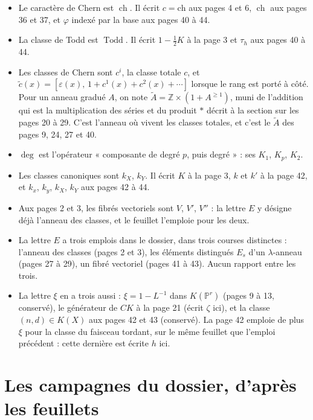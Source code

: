 \documentclass[11pt,a4paper]{article}
\begin{document}
\begin{itemize}
  \item Le caractère de Chern est $\operatorname{ch}$. Il écrit $c = \mathrm{ch}$
  aux pages 4 et 6, $\operatorname{ch}$ aux pages 36 et 37, et $\varphi$
  indexé par la base aux pages 40 à 44.
  \item La classe de Todd est $\operatorname{Todd}$. Il écrit $1 - \tfrac12 K$
  à la page 3 et $\tau_{h}$ aux pages 40 à 44.
  \item Les classes de Chern sont $c^{i}$, la classe totale $c$, et
  $\widetilde{c}(x) = [\varepsilon(x),\, 1 + c^{1}(x) + c^{2}(x) + \cdots]$
  lorsque le rang est porté à côté. Pour un anneau gradué $A$, on note
  $\widetilde{A} = \mathbb{Z} \times (1 + A^{\geqslant 1})$, muni de l'addition
  qui est la multiplication des séries et du produit $\ast$ décrit à la
  section sur les pages 20 à 29. C'est l'anneau où vivent les classes totales,
  et c'est le $\widetilde{A}$ des pages 9, 24, 27 et 40.
  \item $\deg$ est l'opérateur « composante de degré $p$, puis degré » :
  ses $K_{1}$, $K_{p}$, $K_{2}$.
  \item Les classes canoniques sont $k_{X}$, $k_{Y}$. Il écrit $K$ à la page 3,
  $k$ et $k'$ à la page 42, et $k_{x}$, $k_{y}$, $k_{X}$, $k_{Y}$ aux pages 42
  à 44.
  \item Aux pages 2 et 3, les fibrés vectoriels sont $V$, $V'$, $V''$ : la
  lettre $E$ y désigne déjà l'anneau des classes, et le feuillet l'emploie pour
  les deux.
  \item La lettre $E$ a trois emplois dans le dossier, dans trois courses
  distinctes : l'anneau des classes (pages 2 et 3), les éléments distingués
  $E_{s}$ d'un $\lambda$-anneau (pages 27 à 29), un fibré vectoriel (pages 41
  à 43). Aucun rapport entre les trois.
  \item La lettre $\xi$ en a trois aussi : $\xi = 1 - L^{-1}$ dans
  $K(\mathbb{P}^{r})$ (pages 9 à 13, conservé), le générateur de $CK$ à la page
  21 (écrit $\zeta$ ici), et la classe $(n,d) \in K(X)$ aux pages 42 et 43
  (conservé). La page 42 emploie de plus $\xi$ pour la classe du faisceau
  tordant, sur le même feuillet que l'emploi précédent : cette dernière est
  écrite $h$ ici.
\end{itemize}

\section*{Les campagnes du dossier, d'après les feuillets}
\end{document}
